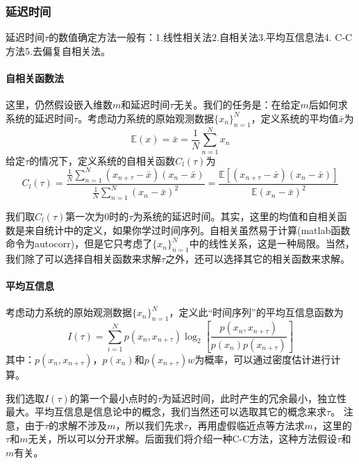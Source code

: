         \subsubsection{延迟时间}
            \par
            延迟时间$\tau$的数值确定方法一般有：1.线性相关法2.自相关法3.平均互信息法4. C-C方法5.去偏复自相关法。
            \paragraph{自相关函数法}
            这里，仍然假设嵌入维数$m$和延迟时间$\tau$无关。我们的任务是：在给定$m$后如何求系统的延迟时间$\tau$。考虑动力系统的原始观测数据$\{x_n\}_{n=1}^N$，定义系统的平均值$\bar{x}$为
            \[
                \mathbb{E}(x) = \bar{x} = \frac{1}{N} \sum_{n = 1}^N x_n
            \]
            给定$\tau$的情况下，定义系统的自相关函数$C_l(\tau)$为
            \[
                C_l(\tau ) = \frac{\frac{1}{N}\sum_{n = 1}^N (x_{n+\tau } - \bar{x})(x_n - \bar{x})}{\frac{1}{N}\sum_{n = 1}^N (x_n - \bar{x})^2} = \frac{\mathbb{E} [(x_{n+\tau } - \bar{x})(x_n - \bar{x})]}{\mathbb{E}(x_n - \bar{x})^2}
            \]
            \par
            我们取$C_l(\tau )$第一次为0时的$\tau $为系统的延迟时间。其实，这里的均值和自相关函数是来自统计中的定义，如果你学过时间序列。自相关虽然易于计算(matlab函数命令为autocorr)，但是它只考虑了$\{x_n\}_{n=1}^N$中的线性关系，这是一种局限。当然，我们除了可以选择自相关函数来求解$\tau$之外，还可以选择其它的相关函数来求解。
            \paragraph{平均互信息}
            考虑动力系统的原始观测数据$\{x_n\}_{n=1}^N$，定义此“时间序列”的平均互信息函数为
            \[
                I(\tau) = \sum_{i = 1}^N p(x_n,x_{n+\tau}) \log_2 \left [\frac{p(x_n,x_{n+\tau})}{p(x_n) p(x_{n+\tau})} \right ]
            \]
            \noindent 其中：$p(x_n,x_{n+\tau})$，$p(x_n)$和$p(x_{n+\tau})w$为概率，可以通过密度估计进行计算。
            \par
            我们选取$I(\tau)$的第一个最小点时的$\tau$为延迟时间，此时产生的冗余最小，独立性最大。平均互信息是信息论中的概念，我们当然还可以选取其它的概念来求$\tau$。
            注意，由于$\tau$的求解不涉及$m$，所以我们先求$\tau$，再用虚假临近点等方法求$m$，这里的$\tau$和$m$无关，所以可以分开求解。后面我们将介绍一种C-C方法，这种方法假设$\tau$和$m$有关。
